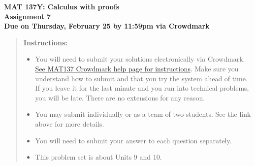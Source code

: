 \documentclass[12pt]{exam}
\begin{document}
{\large
	\begin{center}
		{\bf MAT 137Y: Calculus with proofs}\\
		{\bf Assignment 7} \\
		{\bf Due on Thursday, February 25 by 11:59pm via Crowdmark}
	\end{center}
}

\begin{quotation}
{\bf Instructions:}
	\begin{itemize}
		\item	 You will need to submit your solutions electronically via Crowdmark.   \href{https://www.math.toronto.edu/~alfonso/137/PS/137_CM.html}{See MAT137 Crowdmark help page for instructions}.  Make sure you understand how to submit and that you try the system ahead of time.  If you leave it for the last minute and you run into technical problems, you will be late.  There are no extensions for any reason.
		\item You may submit individually or as a team of two students.  See the link above for more details.
		\item  You will need to submit your answer to each question separately.
		\item  This problem set is about Units 9 and 10.
	\end{itemize}
\end{quotation}
\end{document}
